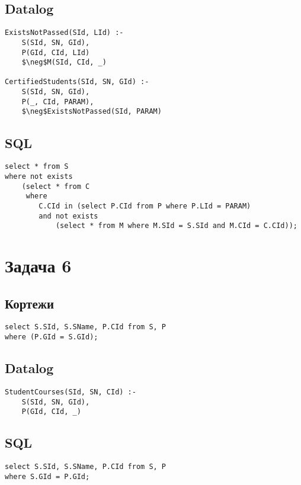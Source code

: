 \documentclass{article}
\begin{document}
\subsection{Datalog}
\begin{lstlisting}[mathescape=true]
ExistsNotPassed(SId, LId) :-
    S(SId, SN, GId),
    P(GId, CId, LId)
    $\neg$M(SId, CId, _)

CertifiedStudents(SId, SN, GId) :-
    S(SId, SN, GId),
    P(_, CId, PARAM),
    $\neg$ExistsNotPassed(SId, PARAM)
\end{lstlisting}


\subsection{SQL}
\begin{lstlisting}[mathescape=true]
select * from S
where not exists
    (select * from C
     where
        C.CId in (select P.CId from P where P.LId = PARAM)
        and not exists
            (select * from M where M.SId = S.SId and M.CId = C.CId));
\end{lstlisting}



\section{Задача 6}

\subsection{Кортежи}
\begin{lstlisting}[mathescape=true]
select S.SId, S.SName, P.CId from S, P
where (P.GId = S.GId);
\end{lstlisting}

\subsection{Datalog}
\begin{lstlisting}[mathescape=true]
StudentCourses(SId, SN, CId) :-
    S(SId, SN, GId),
    P(GId, CId, _)
\end{lstlisting}

\subsection{SQL}
\begin{lstlisting}[mathescape=true]
select S.SId, S.SName, P.CId from S, P
where S.GId = P.GId;
\end{lstlisting}
\end{document}
